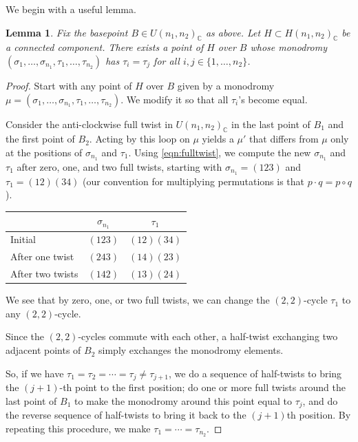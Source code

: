 \documentclass{amsart}
\numberwithin{equation}{section} \numberwithin{figure}{section}
\newcommand\CC{\mathbb{C}}
\theoremstyle{one}
\newtheorem{lemma}[theorem]{\textbf{Lemma}}
\theoremstyle{definition}
\begin{document}
We begin with a useful lemma.
\begin{lemma}\label{lem:color-change}
  Fix the basepoint \(B \in U(n_1,n_2)_{\CC}\) as above.
  Let \(H \subset H(n_1,n_2)_{\CC}\) be a connected component.
  There exists a point of \(H\) over $B$ whose monodromy \((\sigma_1, \dots, \sigma_{n_1}, \tau_1, \dots, \tau_{n_2})\) has \(\tau_i = \tau_j\) for all \(i,j \in \{1, \dots, n_2\}\).
\end{lemma}
\begin{proof}
  Start with any point of \(H\) over \(B\) given by a monodromy \(\mu = (\sigma_1, \dots, \sigma_{n_1}, \tau_1, \dots, \tau_{n_2})\).
  We modify it so that all \(\tau_i\)'s become equal.

  Consider the anti-clockwise full twist in \(U(n_1,n_2)_{\CC}\) in the last point of \(B_1\) and the first point of \(B_2\).
  Acting by this loop on \(\mu\) yields a \(\mu'\) that differs from \(\mu\) only at the positions of \(\sigma_{n_1}\) and \(\tau_{1}\).
  Using \eqref{eqn:fulltwist}, we compute the new \(\sigma_{n_1}\) and \(\tau_1\) after zero, one, and two full twists, starting with \(\sigma_{n_1} = (123)\) and \(\tau_1 = (12)(34)\) (our convention for multiplying permutations is that \(p \cdot q = p \circ q\)).
  \begin{center}
    \begin{tabular}{l c c } \toprule
          & \(\sigma_{n_1}\) & \(\tau_1\) \\ \midrule
        Initial & \((123)\) & \((12)(34)\) \\
      After one twist& \((243)\) & \((14)(23)\)\\
      After two twists& \((142)\) & \((13)(24)\)\\ \bottomrule
    \end{tabular}
  \end{center}
   We see that by zero, one, or two full twists, we can change the \((2,2)\)-cycle \(\tau_1\) to any \((2,2)\)-cycle.

  Since the \((2,2)\)-cycles commute with each other, a half-twist exchanging two adjacent points of \(B_2\) simply exchanges the monodromy elements.

  So, if we have \(\tau_1 = \tau_2 = \cdots = \tau_j \neq \tau_{j+1}\), we do a sequence of half-twists to bring the \((j+1)\)-th point to the first position; do one or more full twists around the last point of \(B_1\) to make the monodromy around this point equal to \(\tau_j\),  and do the reverse sequence of half-twists to bring it back to the \((j+1)\)th position.
  By repeating this procedure, we make \(\tau_1 = \cdots = \tau_{n_2}\).  
\end{proof}
\end{document}
